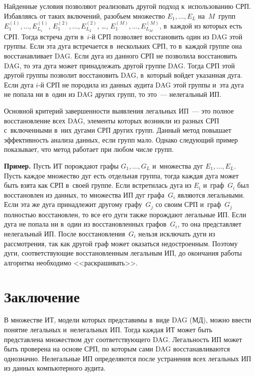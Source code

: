 \begin{multicols}{2}
  Найденные условия позволяют реализовать другой подход к~использованию 
СРП. Избавляясь от таких включений, разобьем множество $E_1,\ldots , E_L$ 
на~$M$~групп $E_1^{(1)},\ldots , E^{(1)}_{L_1}$, $E_1^{(2)},\ldots , 
E^{(2)}_{L_2}$, \ldots , $E_1^{(M)},\ldots , E^{(M)}_{L_M}$, в~каждой из 
которых есть СРП. Тогда встреча дуги в~$i$-й СРП позволяет восстановить один 
из DAG этой группы. Если эта дуга встречается в~нескольких СРП, то в~каждой 
группе она восстанавливает DAG. Если дуга из данного СРП не позволила 
восстановить DAG, то эта дуга может принадлежать другой группе DAG. Тогда 
СРП этой другой группы позволит восстановить DAG, в~который войдет 
указанная дуга. Если дуга $i$-й СРП не породила из данных аудита DAG этой 
группы и~эта дуга не попала ни в~один из DAG других групп, то это~--- 
нелегальный ИП. 
  
  Основной критерий завершенности выявления легальных ИП~--- это полное 
восстановление всех DAG, элементы которых возникли из разных СРП 
с~включенными в~них дугами СРП других групп. Данный метод повышает 
эффективность анализа данных, если групп мало. Однако следующий пример 
показывает, что метод работает при любом чис\-ле групп. 
  
  \smallskip
  
  \noindent
  \textbf{Пример.} Пусть ИТ порождают графы $G_1,\ldots , G_L$ и~множества 
дуг $E_1, \ldots , E_L$. Пусть каждое множество дуг есть отдельная группа, тогда 
каждая дуга может быть взята как СРП в~своей группе. Если встретилась дуга из 
$E_i$ и~граф~$G_i$ был восстановлен из данных, то множества ИП дуг 
графа~$G_i$ являются легальными. Если эта же дуга принадлежит другому 
графу~$G_j$ со своим СРП и~граф~$G_j$ полностью восстановлен, то все его 
дуги также порождают легальные ИП. Если дуга не попала ни в~один из 
восстановленных графов~$G_i$, то она представляет нелегальный ИП. После 
восстановления~$G_i$ нельзя исключать дуги из рассмотрения, так как другой 
граф может оказаться недостроенным. Поэтому дуги, соответствующие 
восстановленным легальным ИП, до окончания работы алгоритма необходимо 
<<раскрашивать>>.  
  
  \section{Заключение }
  
  В множестве ИТ, модели которых представимы в~виде DAG (МД), 
можно ввести понятие легальных и~нелегальных ИП. Тогда каждая ИТ может 
быть представлена множеством дуг соответствующего DAG. Легальность ИП 
может быть проверена на основе СРП, по которым сами DAG восстанавливаются 
однозначно. Нелегальные ИП определяются после устранения всех легальных ИП 
из данных компьютерного аудита. 
  

\end{multicols}
